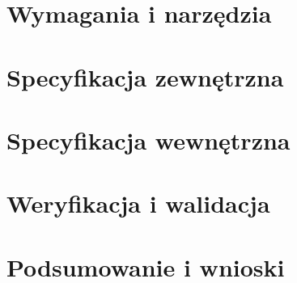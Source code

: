 \documentclass[a4paper, 12pt, twoside]{article}
\begin{document}
\section{Wymagania i narzędzia}

\section{Specyfikacja zewnętrzna}

\section{Specyfikacja wewnętrzna}

\section{Weryfikacja i walidacja}

\section{Podsumowanie i wnioski}

\printbibliography
\end{document}
